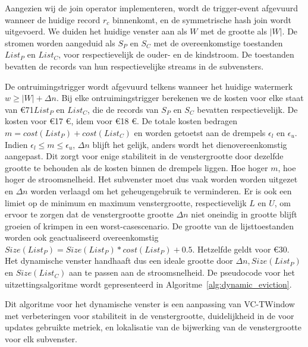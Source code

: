 Aangezien wij de join operator implementeren, wordt de trigger-event afgevuurd wanneer de huidige record 
$r_c$ binnenkomt, en de symmetrische hash join wordt uitgevoerd. We duiden het huidige venster aan als 
$W$ met de grootte als $|W|$. De stromen worden aangeduid als $S_P$ en $S_C$ met 
de overeenkomstige toestanden $List_P$ en $List_C$, voor respectievelijk de ouder- en 
de kindstroom. De toestanden bevatten de records van hun 
respectievelijke streams in de subvensters.

De ontruimingstrigger wordt afgevuurd telkens wanneer het huidige watermerk 
$w \ge |W| + \Delta n$. Bij elke ontruimingstrigger berekenen we
de kosten voor elke staat van €71$List_P$ en $List_C$, die de records van $S_P$ en $S_C$ bevatten
respectievelijk. De kosten voor €17 €, idem voor €18 €. 
De totale kosten bedragen $m = cost(List_P) + cost(List_C)$ en worden getoetst aan de drempels $\epsilon_l$ en $\epsilon_u$. Indien $\epsilon_l \le m \le \epsilon_u$, 
$\Delta n$ blijft het gelijk, anders wordt het dienovereenkomstig aangepast. Dit zorgt voor enige stabiliteit 
in de venstergrootte door dezelfde grootte te behouden als de kosten binnen de drempels liggen. 
Hoe hoger $m$, hoe hoger de stroomsnelheid. Het subvenster moet dus vaak worden 
worden uitgezet en $\Delta n$ worden verlaagd om het geheugengebruik te verminderen. Er is ook een limiet op de 
minimum en maximum venstergrootte, respectievelijk $L$ en $U$, om ervoor te zorgen dat de venstergrootte 
grootte $\Delta n$ niet oneindig in grootte blijft groeien of krimpen in een worst-casescenario. 
De grootte van de lijsttoestanden 
worden ook geactualiseerd overeenkomstig $Size(List_P) = Size(List_P) * cost(List_P) + 0.5$.
Hetzelfde geldt voor €30. 
Het dynamische venster handhaaft dus een 
ideale grootte door $\Delta n, Size(List_P)$ en $Size(List_C)$ aan te passen aan 
de stroomsnelheid. De pseudocode voor het uitzettingsalgoritme wordt gepresenteerd in Algoritme~\ref{alg:dynamic_eviction}.

Dit algoritme voor het dynamische venster is een aanpassing van VC-TWindow~\cite{vctw_join} met 
verbeteringen voor stabiliteit in de venstergrootte, duidelijkheid in de voor updates gebruikte metriek, en lokalisatie 
van de bijwerking van de venstergrootte voor elk subvenster.  

